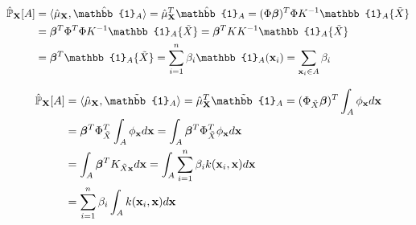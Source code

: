 \documentclass[twoside]{article} \usepackage{aistats2017}
\theoremstyle{definition}
\newcommand{\rv}[1]{{#1}}
\newcommand{\ds}[1]{\tilde{#1}}
\begin{document}
		\begin{equation}
			\begin{aligned}
				\hat{\mathbb{P}}_{\bvec{\rv{X}}}[A] &= \langle \hat{\mu}_{\bvec{\rv{X}}}, \hat{\mathbb{1}}_{A} \rangle = \hat{\mu}_{\bvec{\rv{X}}}^{T}\hat{\mathbb{1}}_{A} = (\Phi \bm{\beta})^{T} \Phi K^{-1} \mathbb{1}_{A}\{\ds{X}\} \\
				&= \bm{\beta}^{T} \Phi^{T} \Phi K^{-1} \mathbb{1}_{A}\{\ds{X}\} = \bm{\beta}^{T} K K^{-1} \mathbb{1}_{A}\{\ds{X}\} \\
				&= \bm{\beta}^{T} \mathbb{1}_{A}\{\ds{X}\} = \sum_{i = 1}^{n} \beta_{i} \mathbb{1}_{A}(\bvec{x}_{i}) = \sum_{\bvec{x}_{i} \in A} \beta_{i}
			\end{aligned}
		\label{eq:empirical_distribution}
		\end{equation}
		
		\begin{equation}
			\begin{aligned}
				\hat{\mathbb{P}}_{\bvec{\rv{X}}}[A] &= \langle \hat{\mu}_{\bvec{\rv{X}}}, \tilde{\mathbb{1}}_{A} \rangle = \hat{\mu}_{\bvec{\rv{X}}}^{T} \tilde{\mathbb{1}}_{A} = (\Phi_{\ds{X}} \bm{\beta})^{T} \int_{A} \phi_{\bvec{x}} d\bvec{x} \\
				&= \bm{\beta}^{T} \Phi_{\ds{X}}^{T} \int_{A} \phi_{\bvec{x}} d\bvec{x} = \int_{A} \bm{\beta}^{T} \Phi_{\ds{X}}^{T} \phi_{\bvec{x}} d\bvec{x} \\
				&= \int_{A} \bm{\beta}^{T} K_{\ds{X} \bvec{x}} d\bvec{x} = \int_{A} \sum_{i = 1}^{n} \beta_{i} k(\bvec{x}_{i}, \bvec{x}) d\bvec{x} \\
				&= \sum_{i = 1}^{n} \beta_{i} \int_{A}  k(\bvec{x}_{i}, \bvec{x}) d\bvec{x} \\
			\end{aligned}
		\label{eq:smooth_empirical_distribution}
		\end{equation}	
			
\end{document}
